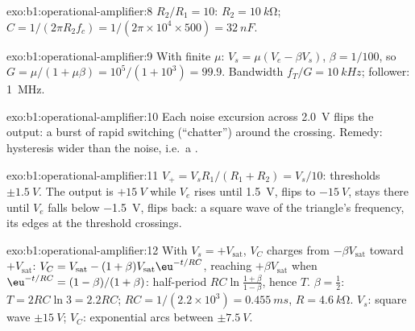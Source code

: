 \begin{solution}{exo:b1:operational-amplifier:8}
$R_2/R_1 = 10$: $R_2 = \qty{10}{k\ohm}$; $C = 1/(2\pi R_2f_c) = 1/(2\pi
\times 10^4 \times 500) = \qty{32}{nF}$.
\end{solution}

\begin{solution}{exo:b1:operational-amplifier:9}
With finite $\mu$: $V_s = \mu(V_e - \beta V_s)$, $\beta = 1/100$, so
$G = \mu/(1 + \mu\beta) = 10^5/(1 + 10^3) = 99.9$. Bandwidth $f_T/G =
\qty{10}{kHz}$; follower: \qty{1}{MHz}.
\end{solution}

\begin{solution}{exo:b1:operational-amplifier:10}
Each noise excursion across \qty{2.0}{V} flips the output: a burst of
rapid switching (``chatter'') around the crossing. Remedy: hysteresis
wider than the noise, i.e.\ a .
\end{solution}

\begin{solution}{exo:b1:operational-amplifier:11}
$V_+ = V_sR_1/(R_1 + R_2) = V_s/10$: thresholds $\pm\qty{1.5}{V}$. The
output is $+\qty{15}{V}$ while $V_e$ rises until \qty{1.5}{V}, flips to
$-\qty{15}{V}$, stays there until $V_e$ falls below \qty{-1.5}{V}, flips
back: a square wave of the triangle's frequency, its edges at the
threshold crossings.
\end{solution}

\begin{solution}{exo:b1:operational-amplifier:12}
With $V_s = +V_{\mathrm{sat}}$, $V_C$ charges from $-\beta V_{\mathrm{sat}}$
toward $+V_{\mathrm{sat}}$: $V_C = V_{\mathrm{sat}} - (1 + \beta)V_{\mathrm{sat}}
\eu^{-t/RC}$, reaching $+\beta V_{\mathrm{sat}}$ when $\eu^{-t/RC} =
(1 - \beta)/(1 + \beta)$: half-period $RC\ln\frac{1 + \beta}{1 - \beta}$,
hence $T$. $\beta = \tfrac12$: $T = 2RC\ln 3 = 2.2RC$; $RC = 1/(2.2 \times
10^3) = \qty{0.455}{ms}$, $R = \qty{4.6}{k\ohm}$. $V_s$: square wave
$\pm\qty{15}{V}$; $V_C$: exponential arcs between $\pm\qty{7.5}{V}$.
\end{solution}

